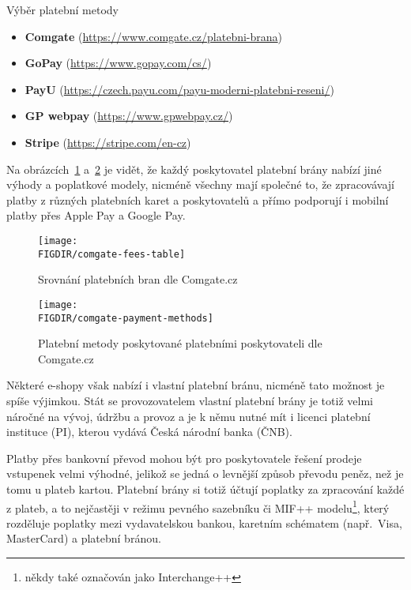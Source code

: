 \begin{subsection}{Výběr platební metody}
    \begin{itemize}
        \item \textbf{Comgate} (\url{https://www.comgate.cz/platebni-brana})
        \item \textbf{GoPay} (\url{https://www.gopay.com/cs/})
        \item \textbf{PayU} (\url{https://czech.payu.com/payu-moderni-platebni-reseni/})
        \item \textbf{GP webpay} (\url{https://www.gpwebpay.cz/})
        \item \textbf{Stripe} (\url{https://stripe.com/en-cz})
    \end{itemize}

    Na obrázcích~\ref{fig:comgate-fees-table} a~\ref{fig:comgate-payment-methods} je vidět, že každý poskytovatel platební brány nabízí jiné výhody a poplatkové modely, nicméně všechny mají společné to, že zpracovávají platby z různých platebních karet a poskytovatelů a přímo podporují i mobilní platby přes Apple Pay a Google Pay.

    \begin{figure}[H]
        \centering
        \caption{Srovnání platebních bran dle Comgate.cz~}
        \texttt{[image: \\FIGDIR/comgate-fees-table]}
        \label{fig:comgate-fees-table}
    \end{figure}

    \begin{figure}[H]
        \centering
        \caption{Platební metody poskytované platebními poskytovateli dle Comgate.cz~}
        \texttt{[image: \\FIGDIR/comgate-payment-methods]}
        \label{fig:comgate-payment-methods}
    \end{figure}

    Některé e-shopy však nabízí i vlastní platební bránu, nicméně tato možnost je spíše výjimkou.
    Stát se provozovatelem vlastní platební brány je totiž velmi náročné na vývoj, údržbu a provoz a je k němu nutné mít i licenci platební instituce (PI)\cite{schejbal_platebni_instituce}, kterou vydává Česká národní banka (ČNB)\cite{cnb_dohled_platebni_instituce}.

    Platby přes bankovní převod mohou být pro poskytovatele řešení prodeje vstupenek velmi výhodné, jelikož se jedná o levnější způsob převodu peněz, než je tomu u plateb kartou.
    Platební brány si totiž účtují poplatky za zpracování každé z plateb, a to nejčastěji v režimu pevného sazebníku či MIF++ modelu\footnote{někdy také označován jako Interchange++}, který rozděluje poplatky mezi vydavatelskou bankou, karetním schématem (např.\ Visa, MasterCard) a platební bránou\cite{gp_podpora_mif}.


\end{subsection}
